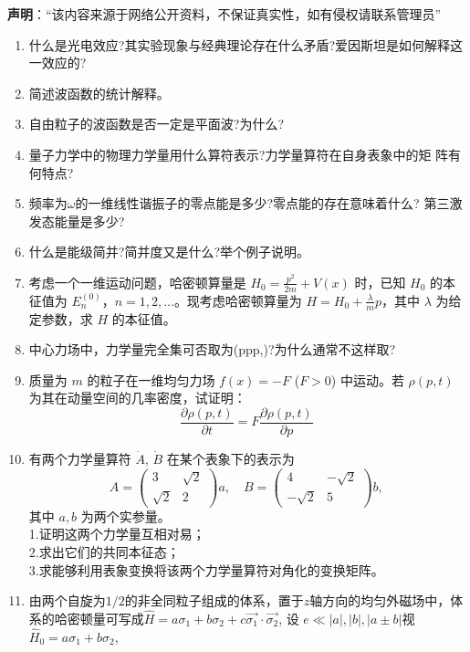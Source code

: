 
\textbf{声明}：“该内容来源于网络公开资料，不保证真实性，如有侵权请联系管理员”


\begin{enumerate}
\item 什么是光电效应?其实验现象与经典理论存在什么矛盾?爱因斯坦是如何解释这一效应的?
\item 简述波函数的统计解释。
\item 自由粒子的波函数是否一定是平面波?为什么?
\item 量子力学中的物理力学量用什么算符表示?力学量算符在自身表象中的矩
阵有何特点?
\item 频率为$\omega$的一维线性谐振子的零点能是多少?零点能的存在意味着什么?
第三激发态能量是多少?
\item 什么是能级简并?简并度又是什么?举个例子说明。
\item 考虑一个一维运动问题，哈密顿算量是 $H_0 = \frac{p^2}{2m} + V(x)$ 时，已知 $H_0$ 的本征值为 $E_n^{(0)}$，$n = 1, 2, \dots$。现考虑哈密顿算量为 $H = H_0 + \frac{\lambda}{m} p$，其中 $\lambda$ 为给定参数，求 $H$ 的本征值。
\item 中心力场中，力学量完全集可否取为(ppp,)?为什么通常不这样取?
\item 质量为 $m$ 的粒子在一维均匀力场 $f(x) = -F$ ($F > 0$) 中运动。若 $\rho(p, t)$ 为其在动量空间的几率密度，试证明：
$$\frac{\partial \rho(p, t)}{\partial t} = F \frac{\partial \rho(p, t)}{\partial p}~$$
\item 有两个力学量算符 $\dot A$, $\dot B$ 在某个表象下的表示为
$$A = \begin{pmatrix}3 & \sqrt{2} \\\sqrt{2} & 2\end{pmatrix} a, \quad B = \begin{pmatrix}4 & -\sqrt{2} \\-\sqrt{2} & 5\end{pmatrix} b,~$$
其中 $a, b$ 为两个实参量。\\
1.证明这两个力学量互相对易；\\
2.求出它们的共同本征态；\\
3.求能够利用表象变换将该两个力学量算符对角化的变换矩阵。\\
\item 由两个自旋为$1/2$的非全同粒子组成的体系，置于$z$轴方向的均匀外磁场中，体系的哈密顿量可写成$\hat{H} = a\sigma_1 + b\sigma_2 + c\vec{\sigma_1} \cdot \vec{\sigma_2}$, 设 $e \ll |a|, |b|, |a \pm b|$视$\hat{H}_0 = a\sigma_1 + b\sigma_2$,



\end{enumerate}
